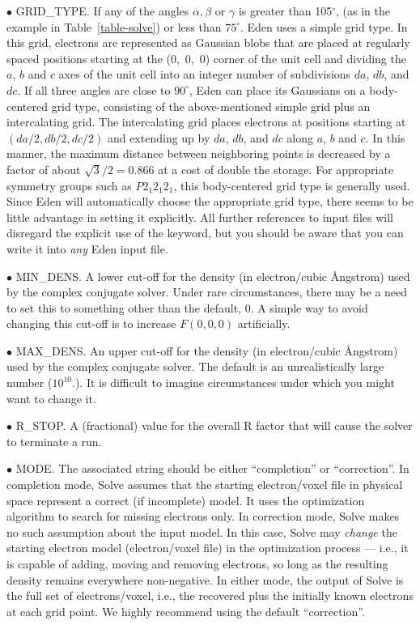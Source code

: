\documentclass{report}
\begin{document}
$\bullet$ GRID\_TYPE. 
If any of the angles $\alpha, \beta$ or $\gamma$ is greater than 105$^\circ$,
(as in the example in Table~\ref{table-solve}) or less than $75^\circ$. 
Eden uses a simple grid type.
In this grid, electrons are represented as Gaussian blobs that are
placed at regularly spaced positions 
starting at the (0,~0,~0) corner of the unit cell and dividing 
the $a$, $b$ and $c$ axes of the unit cell into an integer number of subdivisions 
$da$, $db$, and $dc$.  If all three angles are close to $90^\circ$, 
Eden can place its Gaussians on a
body-centered grid type, consisting of the above-mentioned simple grid 
plus an intercalating grid.
The intercalating grid places electrons at positions starting at 
$(da/2, db/2, dc/2)$ and extending up by $da$, $db$, and $dc$
along $a$, $b$ and $c$.  
In this manner, the maximum distance between neighboring points is decreased by
a factor of about $\sqrt{3}/2 = 0.866$ at a cost of double the storage.
For appropriate symmetry groups such as $P2_{1}2_{1}2_{1}$, this
body-centered grid type is generally used.  Since Eden will automatically
choose the appropriate grid type, there seems to be little advantage in 
setting it explicitly.  All further references to input files will disregard
the explicit use of the keyword, but you should be
aware that you can write it into {\em any} Eden input file.

$\bullet$ MIN\_DENS.
  A lower cut-off for the density (in 
electron/cubic \AA ngstrom) used by the complex conjugate solver.  Under rare
circumstances, there may be a need to set this to something other than the 
default, 0.  A simple way to avoid changing this cut-off is to increase $F(0,0,0)$
artificially.

$\bullet$ MAX\_DENS.
 An upper cut-off for the density (in 
electron/cubic \AA ngstrom) used by the complex conjugate solver.  
The default is an unrealistically large number ($10^{10}$.).  It is difficult
to imagine circumstances under which you might want to change it.

$\bullet$ R\_STOP.
A (fractional) value for the overall R factor that will
cause the solver to terminate a run.

$\bullet$ MODE.
  The associated string should be either ``completion'' 
or ``correction''.  In completion mode, Solve 
assumes that the starting electron/voxel file
in physical space represent a correct (if incomplete) model.  
It uses the optimization algorithm to search for 
missing electrons only.  In correction mode, 
Solve makes no such assumption about the input model.  
In this case, Solve may {\em change} the starting 
electron model (electron/voxel file)
in the optimization process --- i.e., it is capable of adding, moving and
removing electrons, so long as the resulting density remains everywhere non-negative.  
In either mode, the output of Solve 
is the full set of electrons/voxel,
i.e., the recovered plus the initially known electrons at each grid point.  
We highly recommend using the default ``correction''.
\end{document}
